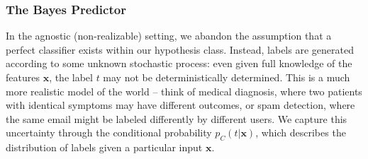 \subsubsection*{The Bayes Predictor}


%
%
%
%
%

In the agnostic (non-realizable) setting, we abandon the assumption that a perfect classifier exists within our hypothesis class. Instead, labels are generated according to some unknown stochastic process: even given full knowledge of the features $\mathbf{x}$, the label $t$ may not be deterministically determined. This is a much more realistic model of the world -- think of medical diagnosis, where two patients with identical symptoms may have different outcomes, or spam detection, where the same email might be labeled differently by different users. We capture this uncertainty through the conditional probability $p_C(t|\mathbf{x})$, which describes the distribution of labels given a particular input $\mathbf{x}$.

